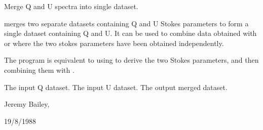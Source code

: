 \begin{manroutinedescription}
        Merge Q and U spectra into single dataset.

        {} merges two separate datasets containing Q and U Stokes
        parameters to form a single dataset containing Q and U. It can
        be used to combine data obtained with {} or {}
        where the two stokes parameters have been obtained independently.

        The program {} is equivalent to using {%
} to derive
        the two Stokes parameters, and then combining them with {}.

\begin{manparametertable}
  The input Q %
dataset.
  The input U dataset.
  The %
output merged dataset.

\end{manparametertable}
         Jeremy Bailey, {}

         19/8/1988

\end{manroutinedescription}
